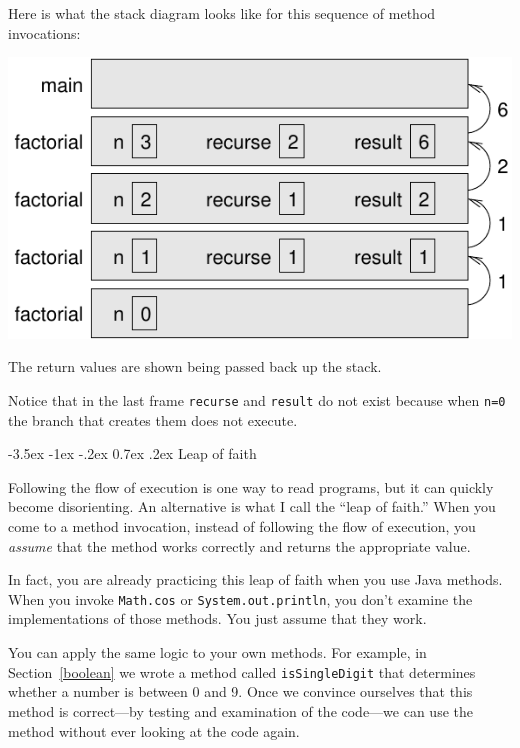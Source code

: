 \documentclass[12pt]{book}
\makeatletter
\renewcommand{\section}{\@startsection {section}{1}{\z@}%
    {-3.5ex \@plus -1ex \@minus -.2ex}%
    {0.7ex \@plus.2ex}%
    {\normalfont\Large\bfseries}}
\theoremstyle{exercise}
\makeatother
\begin{document}

Here is what the stack diagram looks like for this sequence of method invocations:

\includegraphics{figs/stack3.pdf}

The return values are shown being passed back up the stack.

Notice that in the last frame {\tt recurse} and {\tt result} do not exist because when {\tt n=0} the branch that creates them does not execute.


\section{Leap of faith}
\label{leap of faith}


Following the flow of execution is one way to read programs, but it can quickly become disorienting.
An alternative is what I call the ``leap of faith.''
When you come to a method invocation, instead of following the flow of execution, you {\em assume} that the method works correctly and returns the appropriate value.

In fact, you are already practicing this leap of faith when you use Java methods.
When you invoke {\tt Math.cos} or {\tt System.out.println}, you don't examine the implementations of those methods.
You just assume that they work.

You can apply the same logic to your own methods.
For example, in Section~\ref{boolean} we wrote a method called {\tt isSingleDigit} that determines whether a number is between 0 and 9.
Once we convince ourselves that this method is correct---by testing and examination of the code---we can use the method without ever looking at the code again.
\end{document}

